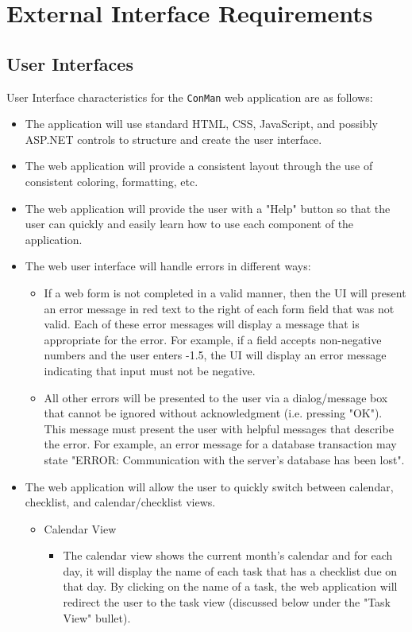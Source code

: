 \documentclass{article}
\begin{document}
\newpage
\section{External Interface Requirements}
\subsection{User Interfaces}
User Interface characteristics for the \texttt{ConMan} web application are as follows:

\begin{itemize}
    \item The application will use standard HTML, CSS, JavaScript, and possibly ASP.NET controls to structure and create the user interface.
    \item The web application will provide a consistent layout through the use of consistent coloring, formatting, etc.
    \item The web application will provide the user with a "Help" button so that the user can quickly and easily learn how to use each component of the application.
    \item The web user interface will handle errors in different ways:
	\begin{itemize}
		\item If a web form is not completed in a valid manner, then the UI will present an error message in red text to the right of each form field that was not valid. 
			Each of these error messages will display a message that is appropriate for the error. 
			For example, if a field accepts non-negative numbers and the user enters -1.5, the UI will display an error message indicating that input must not be negative.
		\item All other errors will be presented to the user via a dialog/message box that cannot be ignored without acknowledgment (i.e. pressing "OK"). 
			This message must present the user with helpful messages that describe the error. 
			For example, an error message for a database transaction may state "ERROR: Communication with the server's database has been lost".
	\end{itemize}
    \item The web application will allow the user to quickly switch between calendar, checklist, and calendar/checklist views.
	\begin{itemize}
		\item Calendar View
		\begin{itemize}
			\item The calendar view shows the current month's calendar and for each day, it will display the name of each task that has a checklist due on that day. 
					By clicking on the name of a task, the web application will redirect the user to the task view (discussed below under the "Task View" bullet).
		\end{itemize}
		

\end{itemize}
\end{itemize}
\end{document}
